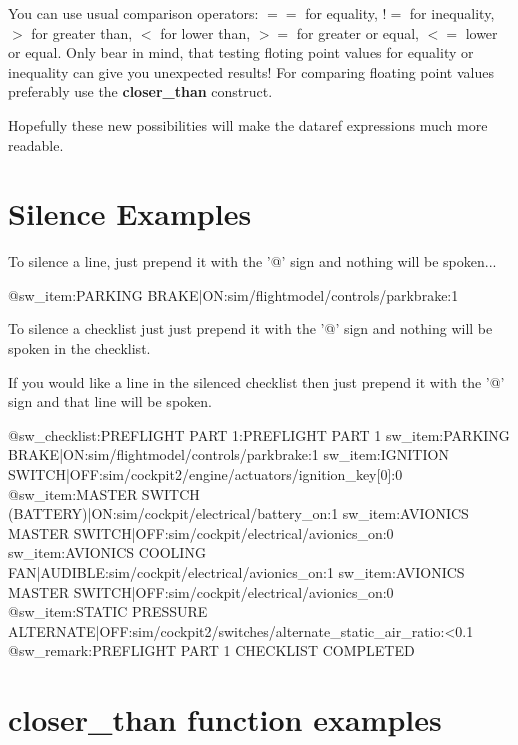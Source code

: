 \documentclass[11pt,parskip=half,a4paper]{scrartcl}
\begin{document}
You can use usual comparison operators: $==$ for equality, $!=$ for inequality, $>$ for greater than, $<$ for lower than, $>=$ for greater or equal, $<=$ lower or equal. Only bear in mind, that testing floting point values for equality or inequality can give you unexpected results! For comparing floating point values preferably use the \textbf{closer\_than} construct.

Hopefully these  new possibilities will make the dataref expressions much more readable.

\newpage
\section{Silence Examples}

To silence a line, just prepend it with the '@' sign and nothing will be spoken...

@sw\_item:PARKING BRAKE|ON:sim/flightmodel/controls/parkbrake:1\newline

To silence a checklist just just prepend it with the '@' sign and nothing will be spoken in the checklist.

If you would like a line in the silenced checklist then just prepend it with the '@' sign and that line will be spoken.

@sw\_checklist:PREFLIGHT PART 1:PREFLIGHT PART 1\newline
sw\_item:PARKING BRAKE|ON:sim/flightmodel/controls/parkbrake:1\newline
sw\_item:IGNITION SWITCH|OFF:sim/cockpit2/engine/actuators/ignition\_key[0]:0\newline
@sw\_item:MASTER SWITCH (BATTERY)|ON:sim/cockpit/electrical/battery\_on:1\newline
sw\_item:AVIONICS MASTER SWITCH|OFF:sim/cockpit/electrical/avionics\_on:0\newline
sw\_item:AVIONICS COOLING FAN|AUDIBLE:sim/cockpit/electrical/avionics\_on:1\newline
sw\_item:AVIONICS MASTER SWITCH|OFF:sim/cockpit/electrical/avionics\_on:0\newline
@sw\_item:STATIC PRESSURE ALTERNATE|OFF:sim/cockpit2/switches/alternate\_static\_air\_ratio:<0.1\newline
@sw\_remark:PREFLIGHT PART 1 CHECKLIST COMPLETED 


\newpage
\section{closer\_than function examples}
\end{document}
